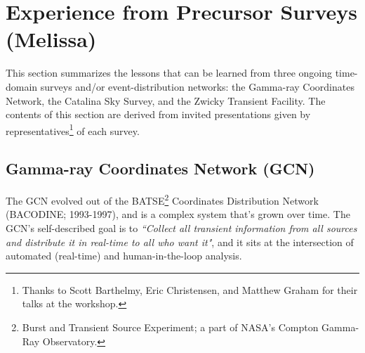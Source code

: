 \section{Experience from Precursor Surveys (Melissa) } \label{sec:precursor}



This section summarizes the lessons that can be learned from three ongoing time-domain surveys and/or event-distribution networks: the Gamma-ray Coordinates Network, the Catalina Sky Survey, and the Zwicky Transient Facility.
The contents of this section are derived from invited presentations given by representatives\footnote{Thanks to Scott Barthelmy, Eric Christensen, and Matthew Graham for their talks at the workshop.} of each survey.

\subsection{Gamma-ray Coordinates Network (GCN)}

The GCN evolved out of the BATSE\footnote{Burst and Transient Source Experiment; a part of NASA's Compton Gamma-Ray Observatory.} Coordinates Distribution Network (BACODINE; 1993-1997), and is a complex system that's grown over time.
The GCN's self-described goal is to {\it ``Collect all transient information from all sources and distribute it in real-time to all who want it"}, and it sits at the intersection of automated (real-time) and human-in-the-loop analysis.

